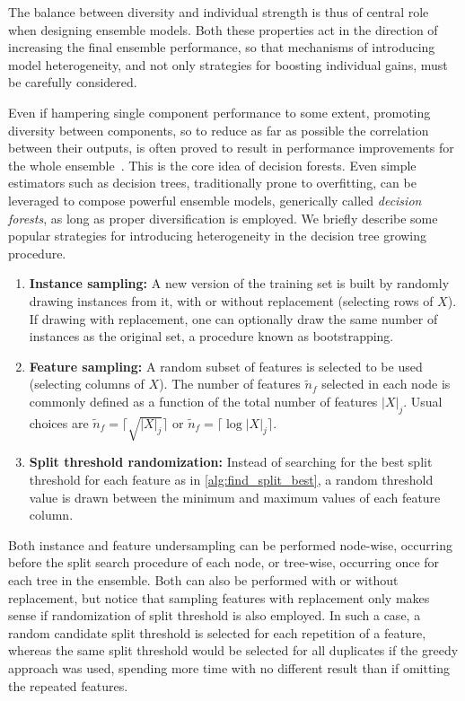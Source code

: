 The balance between diversity 
and individual strength is thus of central role when designing ensemble models. Both these properties act in the direction of increasing the final ensemble performance, so that mechanisms of introducing model heterogeneity, and not only strategies for boosting individual gains, must be carefully considered.

Even if hampering single component performance to some extent, promoting diversity between components, so to reduce as far as possible the correlation between their outputs, is often proved to result in performance improvements for the whole ensemble~\cite{breiman2001}.  %
%
This is the core idea of decision forests. Even simple estimators such as decision trees, traditionally prone to overfitting, can be leveraged to compose powerful ensemble models, generically called \emph{decision forests}, as long as proper diversification is employed.
%
We briefly describe some popular strategies for introducing heterogeneity in the decision tree growing procedure.

\begin{enumerate}  %
    \item \textbf{Instance sampling:} A new version of the training set is built by randomly drawing instances from it, with or without replacement (selecting rows of $X$). If drawing with replacement, one can optionally draw the same number of instances as the original set, a procedure known as bootstrapping.
    \item \textbf{Feature sampling:} A random subset of features is selected to be used (selecting columns of $X$). The number of features $\tilde n_f$ selected in each node is commonly defined as a function of the total number of features $|X|_j$. Usual choices are $\tilde n_f = \lceil \sqrt{|X|_j} \rceil$ or $\tilde n_f = \lceil \log |X|_j \rceil$.
    \item \textbf{Split threshold randomization:} Instead of searching for the best split threshold for each feature as in \autoref{alg:find_split_best}, a random threshold value is drawn between the minimum and maximum values of each feature column.
\end{enumerate}

Both instance and feature undersampling can be performed node-wise, occurring before the split search procedure of each node, or tree-wise, occurring once for each tree in the ensemble. Both can also be performed with or without replacement, but notice that sampling features with replacement only makes sense if randomization of split threshold is also employed. In such a case, a random candidate split threshold is selected for each repetition of a feature, whereas the same split threshold would be selected for all duplicates if the greedy approach was used, spending more time with no different result than if omitting the repeated features.

